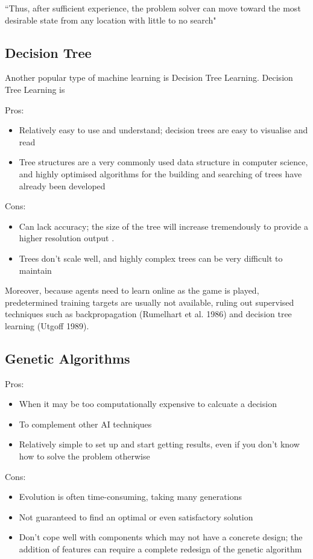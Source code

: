 \documentclass[a4paper,oneside]{report}
\begin{document}
``Thus, after sufficient experience, the problem solver can move toward the most desirable state from any location with little to no search"

\subsection{Decision Tree}

Another popular type of machine learning is Decision Tree Learning. Decision Tree Learning is 

Pros:
\begin{itemize}
	\item Relatively easy to use and understand; decision trees are easy to visualise and read
	\item Tree structures are a very commonly used data structure in computer science, and highly optimised algorithms for the building and searching of trees have already been developed
\end{itemize}

\noindent Cons:
\begin{itemize}
	\item Can lack accuracy; the size of the tree will increase tremendously to provide a higher resolution output \cite{schwab2004ai}.
	\item Trees don't scale well, and highly complex trees can be very difficult to maintain
\end{itemize}

Moreover, because agents need to learn online as the game is played, predetermined training targets are usually not available, ruling out supervised techniques such as backpropagation (Rumelhart et al. 1986) and decision tree learning (Utgoff 1989).

\subsection{Genetic Algorithms}

Pros:
\begin{itemize}
	\item When it may be too computationally expensive to calcuate a decision
	\item To complement other AI techniques
	\item Relatively simple to set up and start getting results, even if you don't know how to solve the problem otherwise
\end{itemize}

\noindent Cons:
\begin{itemize}
	\item Evolution is often time-consuming, taking many generations
	\item Not guaranteed to find an optimal or even satisfactory solution
	\item Don't cope well with components which may not have a concrete design; the addition of features can require a complete redesign of the genetic algorithm
\end{itemize}
\end{document}

